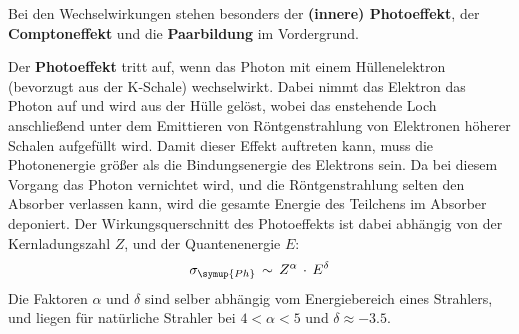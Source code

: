    Bei den Wechselwirkungen stehen besonders der \textbf{(innere) Photoeffekt}, der \textbf{Comptoneffekt} und
    die \textbf{Paarbildung} im Vordergrund.

    Der \textbf{Photoeffekt} tritt auf, wenn das Photon mit einem Hüllenelektron (bevorzugt aus
    der K-Schale) wechselwirkt. Dabei nimmt das Elektron das Photon auf und wird aus der
    Hülle gelöst, wobei das enstehende Loch anschließend unter dem Emittieren von Röntgenstrahlung von Elektronen höherer Schalen aufgefüllt wird.
    Damit dieser Effekt auftreten kann, muss die Photonenergie größer als die Bindungsenergie des Elektrons sein.
    Da bei diesem Vorgang das Photon vernichtet wird, und die Röntgenstrahlung selten den Absorber verlassen kann,
    wird die gesamte Energie des Teilchens im Absorber deponiert. Der Wirkungsquerschnitt des Photoeffekts ist dabei
    abhängig von der Kernladungszahl $Z$, und der Quantenenergie $E$:
    \begin{align}
      \sigma_{\symup{Ph}}\,\sim\,Z^{\alpha}\,\cdot\,E^{\delta}\\
    \end{align}
    Die Faktoren $\alpha$ und $\delta$ sind selber abhängig vom Energiebereich eines Strahlers, und liegen für
    natürliche Strahler bei $4 < \alpha < 5$ und $\delta \approx -3.5$.


